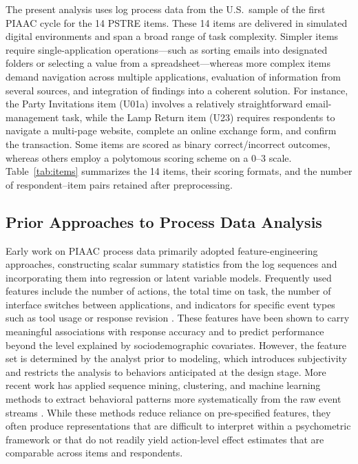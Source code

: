 \documentclass[A4paper,11pt]{article}
\begin{document}
The present analysis uses log process data from the U.S.\ sample of the first PIAAC cycle for the 14 PSTRE items. These 14 items are delivered in simulated digital environments and span a broad range of task complexity. Simpler items require single-application operations---such as sorting emails into designated folders or selecting a value from a spreadsheet---whereas more complex items demand navigation across multiple applications, evaluation of information from several sources, and integration of findings into a coherent solution. For instance, the Party Invitations item (U01a) involves a relatively straightforward email-management task, while the Lamp Return item (U23) requires respondents to navigate a multi-page website, complete an online exchange form, and confirm the transaction. Some items are scored as binary correct/incorrect outcomes, whereas others employ a polytomous scoring scheme on a 0--3 scale. Table~\ref{tab:items} summarizes the 14 items, their scoring formats, and the number of respondent--item pairs retained after preprocessing.

\subsection{Prior Approaches to Process Data Analysis}

Early work on PIAAC process data primarily adopted feature-engineering approaches, constructing scalar summary statistics from the log sequences and incorporating them into regression or latent variable models. Frequently used features include the number of actions, the total time on task, the number of interface switches between applications, and indicators for specific event types such as tool usage or response revision \citep{he2015identifying, he2016analyzing, goldhammer2020analysing}. These features have been shown to carry meaningful associations with response accuracy and to predict performance beyond the level explained by sociodemographic covariates. However, the feature set is determined by the analyst prior to modeling, which introduces subjectivity and restricts the analysis to behaviors anticipated at the design stage. More recent work has applied sequence mining, clustering, and machine learning methods to extract behavioral patterns more systematically from the raw event streams \citep{ulitzsch2023machine}. While these methods reduce reliance on pre-specified features, they often produce representations that are difficult to interpret within a psychometric framework or that do not readily yield action-level effect estimates that are comparable across items and respondents.
\end{document}

